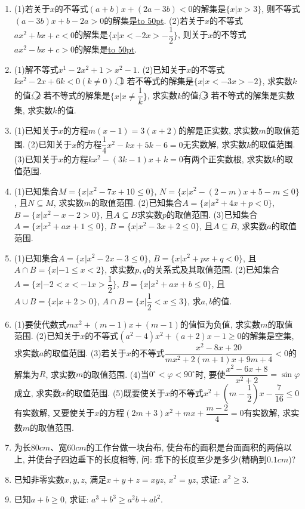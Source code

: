 \documentclass[10pt,a4paper]{article}
\newcommand{\blank}[1]{\underline{\hbox to #1pt{}}}
\begin{document}
\begin{enumerate}[1.]
    (4)若关于$x$的不等式$ax^2+bx-6>0$的解集是$\{x|2<x<3\}$, 则实数$a=$\blank{50}, $b=$\blank{50}.
    \item (1)若关于$x$的不等式$(a+b)x+(2a-3b)<0$的解集是$\{x|x>3\}$, 则不等式$(a-3b)x+b-2a>0$的解集是\blank{50}.
    (2)若关于$x$的不等式$ax^2+bx+c<0$的解集是$\{x|x<-2x>-\dfrac 12\}$, 则关于$x$的不等式$ax^2-bx+c>0$的解集是\blank{50}.
    \item (1)解不等式$x^1-2x^2+1>x^2-1$.
     (2)已知关于$x$的不等式$kx^2-2x+6k<0(k\ne 0)$.
    \textcircled{1} 若不等式的解集是$\{x|x<-3x>-2\}$, 求实数$k$的值;
    \textcircled{2} 若不等式的解集是$\{x|x\ne \dfrac 1k\}$, 求实数$k$的值;
    \textcircled{3} 若不等式的解集是实数集, 求实数$k$的值.
    \item (1)已知关于$x$的方程$m(x-1)=3(x+2)$的解是正实数, 求实数$m$的取值范围.
    (2)已知关于$x$的方程$\dfrac 14{x^2}-kx+5k-6=0$无实数解, 求实数$k$的取值范围.
    (3)已知关于$x$的方程$kx^2-(3k-1)x+k=0$有两个正实数根, 求实数$k$的取值范围.
    \item (1)已知集合$M=\{x|x^2-7x+10\le 0\}$, $N=\{x|x^2-(2-m)x+5-m\le 0\}$, 且$N\subseteq M$, 求实数$m$的取值范围.
    (2)已知集合$A=\{x|x^2+4x+p<0\}$, $B=\{x|x^2-x-2>0\}$, 且$A\subseteq B$求实数$p$的取值范围.
    (3)已知集合$A=\{x|x^2+ax+1\le 0\}$, $B=\{x|x^2-3x+2\le 0\}$, 且$A\subseteq B$, 求实数$a$的取值范围.
    \item (1)已知集合$A=\{x|x^2-2x-3\le 0\}$, $B=\{x|x^2+px+q<0\}$, 且$A\cap B=\{x|-1\le x<2\}$, 求实数$p,q$的关系式及其取值范围.
    (2)已知集合$A=\{x|-2<x<-1x>\dfrac 12\}$, $B=\{x|x^2+ax+b\le 0\}$, 且$A\cup B=\{x|x+2>0\}$, $A\cap B=\{x|\dfrac 12<x\le 3\}$, 求$a,b$的值.
    \item (1)要使代数式$mx^2+(m-1)x+(m-1)$的值恒为负值, 求实数$m$的取值范围.
    (2)已知关于$x$的不等式$(a^2-4)x^2+(a+2)x-1\ge 0$的解集是空集, 求实数$a$的取值范围.
    (3)若关于$x$的不等式$\dfrac{{x^2}-8x+20}{m{x^2}+2(m+1)x+9m+4}<0$的解集为$R$, 求实数$m$的取值范围.
    (4)当$0^\circ <\varphi <90^\circ$时, 要使$\dfrac{{x^2}-6x+8}{{x^2}+2}=\sin \varphi$成立, 求实数$x$的取值范围.
    (5)既要使关于$x$的不等式${x^2}+(m-\dfrac 12)x-\dfrac 7{16}\le 0$有实数解, 又要使关于$x$的方程$(2m+3){x^2}+mx+\dfrac{m-2}4=0$有实数解, 求实数$m$的取值范围.
    \item 为长$80cm$、宽$60cm$的工作台做一块台布, 使台布的面积是台面面积的两倍以上, 并使台子四边垂下的长度相等, 问: 乖下的长度至少是多少(精确到$0.1cm$)?
    \item 已知非零实数$x,y,z$, 满足$x+y+z=xyz$, $x^2=yz$, 求证: $x^2\ge 3$.
    \item 已知$a+b\ge 0$, 求证: $a^3+b^3\ge a^2b+ab^2$.

\end{enumerate}
\end{document}
